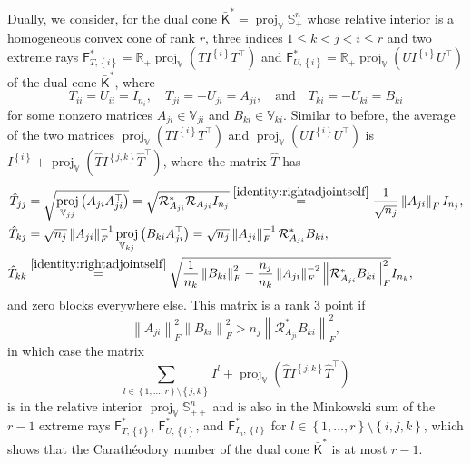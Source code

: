 \documentclass[oneside]{amsart}
\theoremstyle{plain}
\theoremstyle{definition}
\theoremstyle{remark}
\numberwithin{equation}{section}
\DeclareMathOperator{\proj}{proj}
\begin{document}
Dually, we consider, for the dual cone $\bar{\mathsf{K}}^{*} =
\proj_{\mathbb{V}} \mathbb{S}^{n}_{+}$ whose relative interior is a
homogeneous convex cone of rank $r$, three indices $1 \leq k < j < i \leq
r$ and two extreme rays $\mathsf{F}^{*}_{T,\left\{i\right\}} = \mathbb{R}_+
\proj_{\mathbb{V}}\left( T I^{\left\{i\right\}} T^{\top} \right)$ and
$\mathsf{F}^{*}_{U,\left\{i\right\}} = \mathbb{R}_+
\proj_{\mathbb{V}}\left( U I^{\left\{i\right\}} U^{\top} \right)$ of the
dual cone $\bar{\mathsf{K}}^{*}$, where
\[
T_{ii} = U_{ii} = I_{n_{i}}, \quad T_{ji} = -U_{ji} = A_{ji}, \quad
\text{and} \quad T_{ki} = -U_{ki} = B_{ki}
\]
for some nonzero matrices $A_{ji} \in \mathbb{V}_{ji}$ and $B_{ki} \in
\mathbb{V}_{ki}$. Similar to before, the average of the two matrices
$\proj_{\mathbb{V}}\left( T I^{\left\{i\right\}} T^{\top} \right)$ and
$\proj_{\mathbb{V}}\left( U I^{\left\{i\right\}} U^{\top} \right)$ is
$I^{\left\{i\right\}} + \proj_{\mathbb{V}}\left( \hat{T}
I^{\left\{j,k\right\}} \hat{T}^{\top} \right)$, where the matrix $\hat{T}$
has
\[
\begin{aligned}
\hat{T}_{jj} &= \sqrt{\proj_{\mathbb{V}_{jj}}\left( A_{ji} A_{ji}^{\top}
\right)} = \sqrt{\mathcal{R}^{*}_{A_{ji}} \mathcal{R}_{A_{ji}} I_{n_{j}}}
\overset{\ref{identity:rightadjointself}}{=} \frac{1}{\sqrt{n_{j}}}
\left\lVert A_{ji}\right\rVert_{F} I_{n_{j}},
\\
\hat{T}_{kj} &= \sqrt{n_{j}} \left\lVert A_{ji}\right\rVert_{F}^{-1}
\proj_{\mathbb{V}_{kj}}\left( B_{ki} A_{ji}^{\top} \right) = \sqrt{n_{j}}
\left\lVert A_{ji}\right\rVert_{F}^{-1} \mathcal{R}^{*}_{A_{ji}} B_{ki},
\\
\hat{T}_{kk} &\overset{\ref{identity:rightadjointself}}{=}
\sqrt{\frac{1}{n_{k}} \left\lVert B_{ki}\right\rVert_{F}^{2} -
\frac{n_{j}}{n_{k}} \left\lVert A_{ji}\right\rVert_{F}^{-2} \left\lVert
\mathcal{R}^{*}_{A_{ji}} B_{ki}\right\rVert_{F}^{2}} I_{n_{k}},
\end{aligned}
\]
and zero blocks everywhere else. This matrix is a rank $3$ point if
\[
\left\lVert A_{ji}\right\rVert_{F}^{2} \left\lVert
B_{ki}\right\rVert_{F}^{2} > n_{j} \left\lVert \mathcal{R}^{*}_{A_{ji}}
B_{ki}\right\rVert_{F}^{2},
\]
in which case the matrix
\[
\sum_{l \in \left\{1, \dots, r\right\} \setminus \left\{j,k\right\}} I^{l}
+ \proj_{\mathbb{V}}\left( \hat{T} I^{\left\{j,k\right\}} \hat{T}^{\top}
\right)
\]
is in the relative interior $\proj_{\mathbb{V}} \mathbb{S}^{n}_{++}$ and is
also in the Minkowski sum of the $r-1$ extreme rays
$\mathsf{F}^{*}_{T,\left\{i\right\}}$,
$\mathsf{F}^{*}_{U,\left\{i\right\}}$, and
$\mathsf{F}^{*}_{I_{n},\left\{l\right\}}$ for $l \in \left\{1, \dots,
r\right\} \setminus \left\{i,j,k\right\}$, which shows that the
Carath\'eodory number of the dual cone $\bar{\mathsf{K}}^{*}$ is at most
$r-1$.
\end{document}
